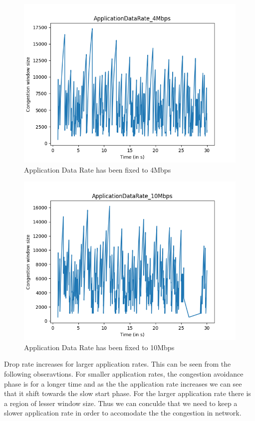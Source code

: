 \documentclass{article}
\begin{document}
\begin{figure}[H]
    \centering
    \includegraphics[scale = 0.8]{Q2/outputs/plots/ApplicationDataRate_4Mbps.png}
    \caption{Application Data Rate has been fixed to 4Mbps}
\end{figure}

\begin{figure}[H]
    \centering
    \includegraphics[scale = 0.8]{Q2/outputs/plots/ApplicationDataRate_10Mbps.png}
    \caption{Application Data Rate has been fixed to 10Mbps}
\end{figure}

Drop rate increases for larger application rates. This can be seen from the following obseravtions. For smaller application rates, the congestion avoidance phase is for a longer time and as the the application rate increases we can see that it shift towards the slow start phase. For the larger application rate there is a region of lesser window size. Thus we can conculde that we need to keep a slower application rate in order to accomodate the the congestion in network.
\end{document}
